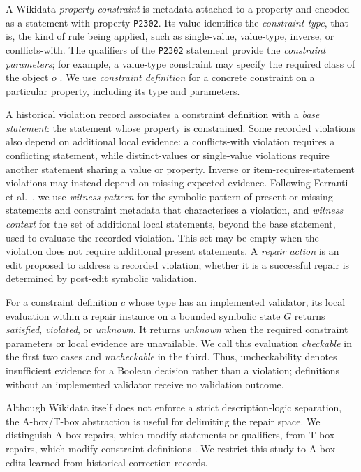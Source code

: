\documentclass[a4paper,UKenglish,cleveref,autoref,thm-restate]{tgdk-v2021}
\begin{document}
A Wikidata \emph{property constraint} is metadata attached to a property and encoded as a statement with property \texttt{P2302}. Its value identifies the \emph{constraint type}, that is, the kind of rule being applied, such as single-value, value-type, inverse, or conflicts-with. The qualifiers of the \texttt{P2302} statement provide the \emph{constraint parameters}; for example, a value-type constraint may specify the required class of the object \(o\) \cite{ferranti2024formalizing,ferranti2025repairs, wikidataPropertyConstraintsPortal,wikibaseQualityConstraints}. We use \emph{constraint definition} for a concrete constraint on a particular property, including its type and parameters.

A historical violation record associates a constraint definition with a \emph{base statement}: the statement whose property is constrained. Some recorded violations also depend on additional local evidence: a conflicts-with violation requires a conflicting statement, while distinct-values or single-value violations require another statement sharing a value or property. Inverse or item-requires-statement violations may instead depend on missing expected evidence. Following Ferranti et al.~\cite{ferranti2025repairs}, we use \emph{witness pattern} for the symbolic pattern of present or missing statements and constraint metadata that characterises a violation, and \emph{witness context} for the set of additional local statements, beyond the base statement, used to evaluate the recorded violation. This set may be empty when the violation does not require additional present statements. A \emph{repair action} is an edit proposed to address a recorded violation; whether it is a successful repair is determined by post-edit symbolic validation.

For a constraint definition \(c\) whose type has an implemented validator, its local evaluation within a repair instance on a bounded symbolic state \(G\) returns \emph{satisfied}, \emph{violated}, or \emph{unknown}. It returns \emph{unknown} when the required constraint parameters or local evidence are unavailable. We call this evaluation \emph{checkable} in the first two cases and \emph{uncheckable} in the third. Thus, uncheckability denotes insufficient evidence for a Boolean decision rather than a violation; definitions without an implemented validator receive no validation outcome. %

Although Wikidata itself does not enforce a strict description-logic separation, the A-box/T-box abstraction is useful for delimiting the repair space. We distinguish A-box repairs, which modify statements or qualifiers, from T-box repairs, which modify constraint definitions . We restrict this study to A-box edits learned from historical correction records. %
\end{document}
